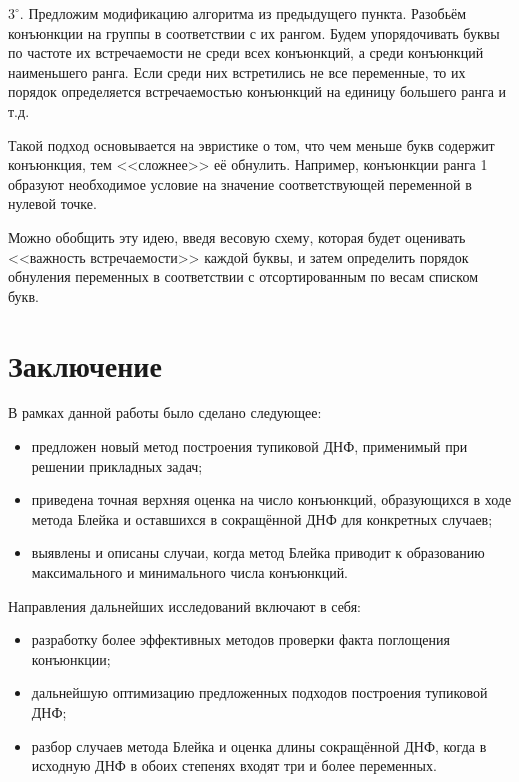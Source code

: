 \documentclass[12pt,a4paper,oneside,fleqn,leqno]{article}
\theoremstyle{definition}
\begin{document}
		$3^{\circ}.$ Предложим модификацию алгоритма из предыдущего пункта. Разобьём конъюнкции на группы в соответствии с их рангом. Будем упорядочивать буквы по частоте их встречаемости не среди всех конъюнкций, а среди конъюнкций наименьшего ранга. Если среди них встретились не все переменные, то их порядок определяется встречаемостью конъюнкций на единицу большего ранга и т.д.\par
		Такой подход основывается на эвристике о том, что чем меньше букв содержит конъюнкция, тем <<сложнее>> её обнулить. Например, конъюнкции ранга 1 образуют необходимое условие на значение соответствующей переменной в нулевой точке.\par
		Можно обобщить эту идею, введя весовую схему, которая будет оценивать <<важность встречаемости>> каждой буквы, и затем определить порядок обнуления переменных в соответствии с отсортированным по весам списком букв.\par
\newpage

\section*{Заключение}
	В рамках данной работы было сделано следующее:
	\begin{itemize}
		\item
		предложен новый метод построения тупиковой ДНФ, применимый при решении прикладных задач;
		\item
		приведена точная верхняя оценка на число конъюнкций, образующихся в ходе метода Блейка и оставшихся в сокращённой ДНФ для конкретных случаев;
		\item
		выявлены и описаны случаи, когда метод Блейка приводит к образованию максимального и минимального числа конъюнкций.
	\end{itemize}\par
	Направления дальнейших исследований включают в себя:
	\begin{itemize}
		\item
		разработку более эффективных методов проверки факта поглощения конъюнкции;
		\item
		дальнейшую оптимизацию предложенных подходов построения тупиковой ДНФ;
		\item
		разбор случаев метода Блейка и оценка длины сокращённой ДНФ, когда в исходную ДНФ в обоих степенях входят три и более переменных.
	\end{itemize}\par
\newpage
\end{document}

